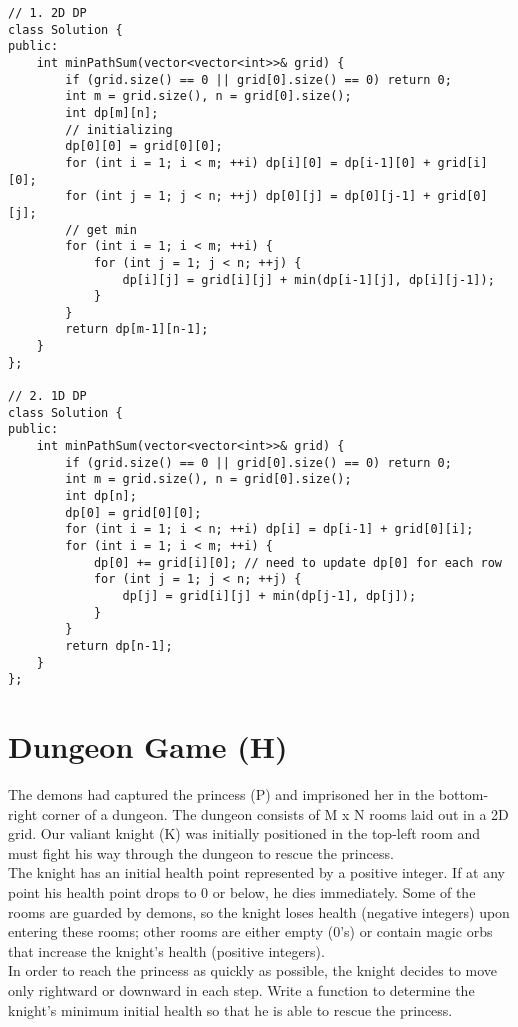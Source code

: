 \begin{lstlisting}
// 1. 2D DP
class Solution {
public:
    int minPathSum(vector<vector<int>>& grid) {
        if (grid.size() == 0 || grid[0].size() == 0) return 0;
        int m = grid.size(), n = grid[0].size();
        int dp[m][n];
        // initializing
        dp[0][0] = grid[0][0];
        for (int i = 1; i < m; ++i) dp[i][0] = dp[i-1][0] + grid[i][0];
        for (int j = 1; j < n; ++j) dp[0][j] = dp[0][j-1] + grid[0][j];
        // get min
        for (int i = 1; i < m; ++i) {
            for (int j = 1; j < n; ++j) {
                dp[i][j] = grid[i][j] + min(dp[i-1][j], dp[i][j-1]);
            }
        }    
        return dp[m-1][n-1];
    }
};

// 2. 1D DP
class Solution {
public:
    int minPathSum(vector<vector<int>>& grid) {
        if (grid.size() == 0 || grid[0].size() == 0) return 0;
        int m = grid.size(), n = grid[0].size();
        int dp[n];
        dp[0] = grid[0][0];
        for (int i = 1; i < n; ++i) dp[i] = dp[i-1] + grid[0][i];
        for (int i = 1; i < m; ++i) {
            dp[0] += grid[i][0]; // need to update dp[0] for each row
            for (int j = 1; j < n; ++j) {
                dp[j] = grid[i][j] + min(dp[j-1], dp[j]);
            }
        }
        return dp[n-1];
    }
};
\end{lstlisting}


\section{Dungeon Game (H)}
The demons had captured the princess (P) and imprisoned her in the bottom-right corner of a dungeon. The dungeon consists of M x N rooms laid out in a 2D grid. Our valiant knight (K) was initially positioned in the top-left room and must fight his way through the dungeon to rescue the princess. \\

The knight has an initial health point represented by a positive integer. If at any point his health point drops to 0 or below, he dies immediately. Some of the rooms are guarded by demons, so the knight loses health (negative integers) upon entering these rooms; other rooms are either empty (0's) or contain magic orbs that increase the knight's health (positive integers).\\

In order to reach the princess as quickly as possible, the knight decides to move only rightward or downward in each step. Write a function to determine the knight's minimum initial health so that he is able to rescue the princess.\\

